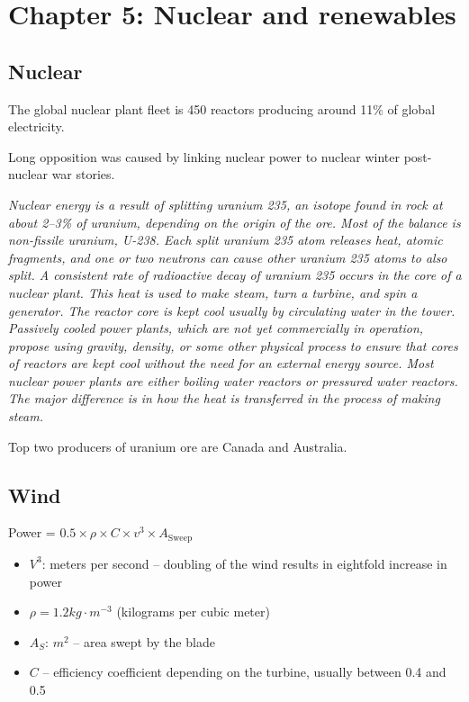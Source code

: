 \section{Chapter 5: Nuclear and renewables}

\subsection{Nuclear}

The global nuclear plant fleet is 450 reactors producing around 11\% of global
electricity.

Long opposition was caused by linking nuclear power to nuclear winter
post-nuclear war stories.

\textit{
Nuclear energy is a result of splitting uranium 235, an isotope found in rock
at about 2–3\% of uranium, depending on the origin of the ore. Most of the
balance is non-fissile uranium, U-238. Each split uranium 235 atom releases
heat, atomic fragments, and one or two neutrons can cause other uranium 235
atoms to also split. A consistent rate of radioactive decay of uranium 235
occurs in the core of a nuclear plant. This heat is used to make steam, turn a
turbine, and spin a generator. The reactor core is kept cool usually by
circulating water in the tower. Passively cooled power plants, which are not
yet commercially in operation, propose using gravity, density, or some other
physical process to ensure that cores of reactors are kept cool without the
need for an external energy source. Most nuclear power plants are either
boiling water reactors or pressured water reactors. The major difference is in
how the heat is transferred in the process of making steam.
}

Top two producers of uranium ore are Canada and Australia.

\subsection{Wind}

Power = $0.5 \times \rho \times C \times v^3 \times A_{\text{Sweep}}$

\begin{itemize}
	\item $V^3$: meters per second -- doubling of the wind results in
	eightfold increase in power
	\item $\rho = 1.2kg \cdot m^{-3}$ (kilograms per cubic meter)
	\item $A_S$: $m^2$ -- area swept by the blade
	\item $C$ -- efficiency coefficient depending on the turbine, usually
	between 0.4 and 0.5
\end{itemize}
